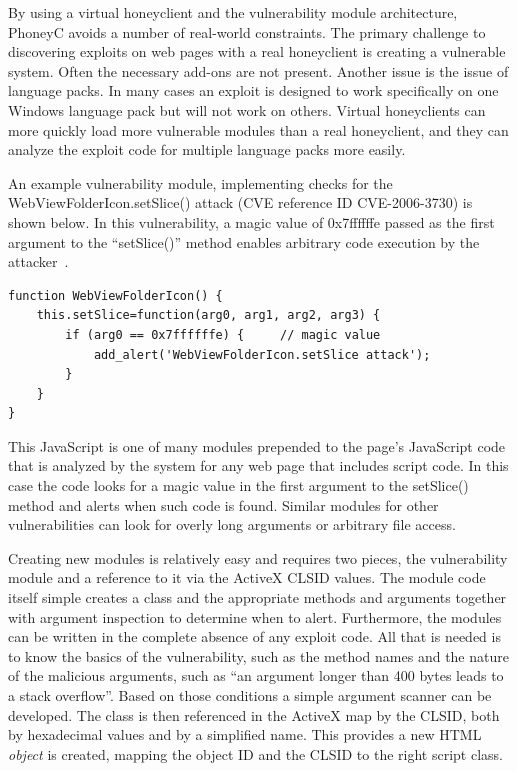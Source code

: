 \documentclass[10pt,twocolumn]{article}
\begin{document}
By using a virtual honeyclient and the vulnerability module architecture, PhoneyC avoids a number of real-world constraints. The primary challenge to discovering exploits on web pages with a real honeyclient is creating a vulnerable system. Often the necessary add-ons are not present. Another issue is the issue of language packs. In many cases an exploit is designed to work specifically on one Windows language pack but will not work on others. Virtual honeyclients can more quickly load more vulnerable modules than a real honeyclient, and they can analyze the exploit code for multiple language packs more easily.

An example vulnerability module, implementing checks for the WebViewFolderIcon.setSlice() attack (CVE reference ID CVE-2006-3730) is shown below. In this vulnerability, a magic value of 0x7ffffffe passed as the first argument to the ``setSlice()'' method enables arbitrary code execution by the attacker~\cite{setslice}. 
\scriptsize
\begin{verbatim}
function WebViewFolderIcon() {
    this.setSlice=function(arg0, arg1, arg2, arg3) {
        if (arg0 == 0x7ffffffe) {     // magic value
            add_alert('WebViewFolderIcon.setSlice attack');
        }
    }
}
\end{verbatim}
\normalsize
This JavaScript is one of many modules prepended to the page's JavaScript code that is analyzed by the system for any web page that includes script code. In this case the code looks for a magic value in the first argument to the setSlice() method and alerts when such code is found. Similar modules for other vulnerabilities can look for overly long arguments or arbitrary file access.

Creating new modules is relatively easy and requires two pieces, the vulnerability module and a reference to it via the ActiveX CLSID values. The module code itself simple creates a class and the appropriate methods and arguments together with argument inspection to determine when to alert. Furthermore, the modules can be written in the complete absence of any exploit code. All that is needed is to know the basics of the vulnerability, such as the method names and the nature of the malicious arguments, such as ``an argument longer than 400 bytes leads to a stack overflow''. Based on those conditions a simple argument scanner can be developed. The class is then referenced in the ActiveX map by the CLSID, both by hexadecimal values and by a simplified name. This provides a new HTML {\em object} is created, mapping the object ID and the CLSID to the right script class. 
\end{document}
